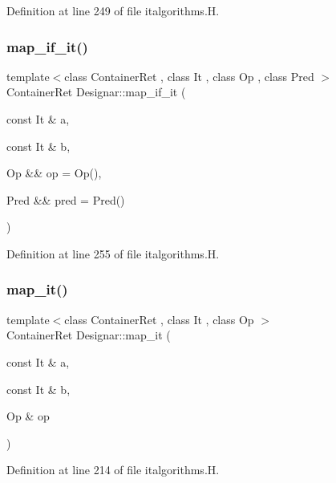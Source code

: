 Definition at line 249 of file italgorithms.\+H.

\mbox{\label{namespace_designar_ae62503515f0226ac0cc91c94c1176fd5}} 
\subsubsection{\texorpdfstring{map\+\_\+if\+\_\+it()}{map\_if\_it()}\hspace{0.1cm}{\footnotesize\ttfamily [4/4]}}
{\footnotesize\ttfamily template$<$class Container\+Ret , class It , class Op , class Pred $>$ \\
Container\+Ret Designar\+::map\+\_\+if\+\_\+it (\begin{DoxyParamCaption}\item[{const It \&}]{a,  }\item[{const It \&}]{b,  }\item[{Op \&\&}]{op = {\ttfamily Op()},  }\item[{Pred \&\&}]{pred = {\ttfamily Pred()} }\end{DoxyParamCaption})}



Definition at line 255 of file italgorithms.\+H.

\mbox{\label{namespace_designar_afc87b7b7fbcaed27883b20975ff10e3a}} 
\subsubsection{\texorpdfstring{map\+\_\+it()}{map\_it()}\hspace{0.1cm}{\footnotesize\ttfamily [1/2]}}
{\footnotesize\ttfamily template$<$class Container\+Ret , class It , class Op $>$ \\
Container\+Ret Designar\+::map\+\_\+it (\begin{DoxyParamCaption}\item[{const It \&}]{a,  }\item[{const It \&}]{b,  }\item[{Op \&}]{op }\end{DoxyParamCaption})}



Definition at line 214 of file italgorithms.\+H.

